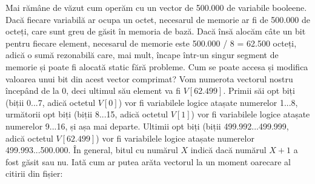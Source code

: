 Mai rămâne de văzut cum operăm cu un vector de 500.000 de variabile
booleene. Dacă fiecare variabilă ar ocupa un octet, necesarul de memorie ar fi
de 500.000 de octeți, care sunt greu de găsit în memoria de bază. Dacă însă
alocăm câte un bit pentru fiecare element, necesarul de memorie este 500.000 /
8 = 62.500 octeți, adică o sumă rezonabilă care, mai mult, încape într-un
singur segment de memorie și poate fi alocată static fără probleme. Cum se
poate accesa și modifica valoarea unui bit din acest vector comprimat? Vom
numerota vectorul nostru începând de la 0, deci ultimul său element va fi
$V[62.499]$. Primii săi opt biți (biții 0...7, adică octetul $V[0]$) vor fi
variabilele logice atașate numerelor 1...8, următorii opt biți (biții 8...15,
adică octetul $V[1]$) vor fi variabilele logice atașate numerelor 9...16, și
așa mai departe. Ultimii opt biți (biții 499.992...499.999, adică octetul
$V[62.499]$) vor fi variabilele logice atașate numerelor 499.993...500.000. În
general, bitul cu numărul $X$ indică dacă numărul $X + 1$ a fost găsit sau
nu. Iată cum ar putea arăta vectorul la un moment oarecare al citirii din
fișier:


